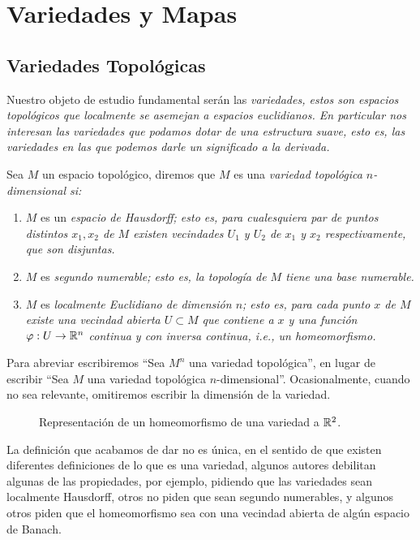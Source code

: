\chapter{Variedades y Mapas}\label{Capítulo: Variedades y Mapas}
\section{Variedades Topológicas}\label{Sección: Variedades Topologicas}
Nuestro objeto de estudio fundamental serán las \it{variedades}, estos son espacios topológicos que localmente se asemejan a espacios euclidianos. En particular nos interesan las variedades que podamos dotar de una estructura suave, esto es, las variedades en las que podemos darle un significado a la derivada.

\begin{definition}\label{Definición: Variedad Topologica}
	Sea $M$ un espacio topológico, diremos que $M$ es una \it{variedad topológica $n$-dimensional} si:
	\begin{enumerate}
		\item $M$ es un \it{espacio de Hausdorff}; esto es, para cualesquiera par de puntos distintos $x_1,x_2$ de $M$ existen vecindades $U_1$ y $U_2$ de $x_1$ y $x_2$ respectivamente, que son disjuntas.
		\item $M$ es \it{segundo numerable}; esto es, la topología de $M$ tiene una base numerable.
		\item $M$ es \it{localmente Euclidiano} de dimensión $n$; esto es, para cada punto $x$ de $M$ existe una vecindad abierta $U \subset M$ que contiene a $x$ y una función $\varphi: U \to \mathbb{R}^n$ continua y con inversa continua, i.e., un \it{homeomorfismo}.
	\end{enumerate}
\end{definition}

Para abreviar escribiremos \enquote{Sea $M^n$ una variedad topológica},  en lugar de escribir \enquote{Sea $M$ una variedad topológica $n$-dimensional}. Ocasionalmente, cuando no sea relevante, omitiremos escribir la dimensión de la variedad.

\begin{figure}[h]
	\begin{center}
		
		\caption{Representación de un homeomorfismo de una variedad a $\mathbb{R}^{2}$.}
	\end{center}
\end{figure}

La definición que acabamos de dar no es única, en el sentido de que existen diferentes definiciones de lo que es una variedad, algunos autores debilitan algunas de las propiedades, por ejemplo, pidiendo que las variedades sean localmente Hausdorff, otros no piden que sean segundo numerables, y algunos otros piden que el homeomorfismo sea con una vecindad abierta de algún espacio de Banach.

